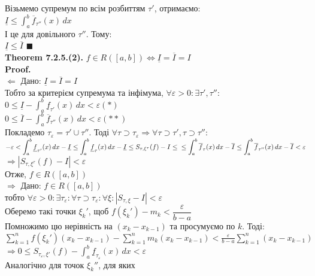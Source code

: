 \documentclass[a4paper, 14pt]{extarticle}
\def\huge{\displaystyle}
\def\bigline{\vspace{5mm}\\}
\def\th#1{\textbf{Theorem {#1}}}
\def\proof{\textbf{Proof.}\\}
\def\bigline{\vspace{5mm}\\}
\def\qed{$\blacksquare$}
\begin{document}
Візьмемо супремум по всім розбиттям $\tau'$, отримаємо:\\
$\huge \underline{I} \leq \int_a^b \overline{f}_{\tau''}(x)\,dx$\\
І це для довільного $\tau''$. Тому:\\
$\underline{I} \leq \overline{I}$ \qed
\bigline
\th{7.2.5.(2).} $f \in R([a,b]) \iff \underline{I} = \overline{I} = I$\\
\proof
$\boxed{\Leftarrow}$ Дано: $\underline{I} = \overline{I} = I$\\
Тобто за критерієм супремума та інфімума,  $\forall \varepsilon > 0: \exists \tau', \tau'':$\\
$0 \leq \underline{I} - \huge \int_a^b \underline{f}_{\tau'}(x)\,dx < \varepsilon (*)$\\
$0 \leq \overline{I} - \huge \int_a^b \overline{f}_{\tau''}(x)\,dx < \varepsilon (**)$\\
Покладемо $\tau_{\varepsilon} = \tau' \cup \tau''$. Тоді $\forall \tau \supset \tau_{\varepsilon} \Rightarrow \forall \tau \supset \tau', \tau \supset \tau'':$\\
$-\varepsilon < \huge \int_{a}^b \underline{f}_{\tau'} (x)\,dx - \underline{I} \leq \int_a^b \underline{f}_{\tau} (x)\,dx - \underline{I} \leq S_{\tau, \xi^{\tau}}(f) - I \leq \\ \leq \int_a^b \overline{f}_{\tau}(x)\,dx - \overline{I} \leq \int_a^b \overline{f}_{\tau''}(x)\,dx - \overline{I} <\varepsilon$\\
$\Rightarrow |S_{\tau, \xi^{\tau}}(f) - I| < \varepsilon$\\
Отже, $f \in R([a,b])$
\bigline
$\boxed{\Rightarrow}$ Дано: $f \in R([a,b])$\\
тобто $\forall \varepsilon > 0: \exists \tau_{\varepsilon}: \forall \tau \supset \tau_{\varepsilon}: \forall \xi: |S_{\tau, \xi} - I| < \varepsilon$\\
Оберемо такі точки $\xi_k'$, щоб $f(\xi_k')-m_k < \dfrac{\varepsilon}{b-a}$\\
Помножимо цю нерівність на $(x_k-x_{k-1})$ та просумуємо по $k$. Тоді:\\
$\huge \sum_{k=1}^n f(\xi_k')(x_k-x_{k-1}) - \sum_{k=1}^n m_k(x_k-x_{k-1}) < \frac{\varepsilon}{b-a} \sum_{k=1}^n (x_k-x_{k-1})$\\
$\Rightarrow 0 \leq S_{\tau_{\varepsilon}, \xi'}(f) - \huge \int_{a}^b \underline{f}_{\tau_{\varepsilon}}(x)\,dx < \varepsilon$\\
Аналогічно для точок $\xi_k''$, для яких\\
\end{document}
